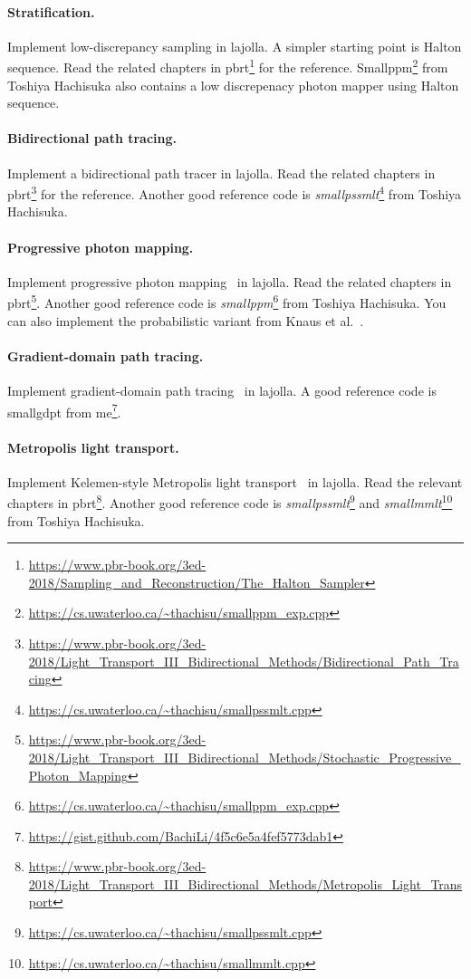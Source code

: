 \paragraph{Stratification.}
Implement low-discrepancy sampling in lajolla.
A simpler starting point is Halton sequence.
Read the related chapters in pbrt\footnote{\url{https://www.pbr-book.org/3ed-2018/Sampling_and_Reconstruction/The_Halton_Sampler}} for the reference.
Smallppm\footnote{\url{https://cs.uwaterloo.ca/~thachisu/smallppm_exp.cpp}} from Toshiya Hachisuka also contains a low discrepenacy photon mapper using Halton sequence.

\paragraph{Bidirectional path tracing.}
Implement a bidirectional path tracer in lajolla.
Read the related chapters in pbrt\footnote{\url{https://www.pbr-book.org/3ed-2018/Light_Transport_III_Bidirectional_Methods/Bidirectional_Path_Tracing}} for the reference.
Another good reference code is \textit{smallpssmlt}\footnote{\url{https://cs.uwaterloo.ca/~thachisu/smallpssmlt.cpp}} from Toshiya Hachisuka.

\paragraph{Progressive photon mapping.}
Implement progressive photon mapping~\cite{Hachisuka:2008:PPM} in lajolla.
Read the related chapters in pbrt\footnote{\url{https://www.pbr-book.org/3ed-2018/Light_Transport_III_Bidirectional_Methods/Stochastic_Progressive_Photon_Mapping}}.
Another good reference code is \textit{smallppm}\footnote{\url{https://cs.uwaterloo.ca/~thachisu/smallppm_exp.cpp}} from Toshiya Hachisuka.
You can also implement the probabilistic variant from Knaus et al.~\cite{Knaus:2011:PPM}.

\paragraph{Gradient-domain path tracing.} 
Implement gradient-domain path tracing~\cite{Kettunen:2015:GPT} in lajolla.
A good reference code is smallgdpt from me\footnote{\url{https://gist.github.com/BachiLi/4f5c6e5a4fef5773dab1}}.

\paragraph{Metropolis light transport.} Implement Kelemen-style Metropolis light transport~\cite{Kelemen:2002:SRM} in lajolla. Read the relevant chapters in pbrt\footnote{\url{https://www.pbr-book.org/3ed-2018/Light_Transport_III_Bidirectional_Methods/Metropolis_Light_Transport}}. Another good reference code is \textit{smallpssmlt}\footnote{\url{https://cs.uwaterloo.ca/~thachisu/smallpssmlt.cpp}} and \textit{smallmmlt}\footnote{\url{https://cs.uwaterloo.ca/~thachisu/smallmmlt.cpp}} from Toshiya Hachisuka.

